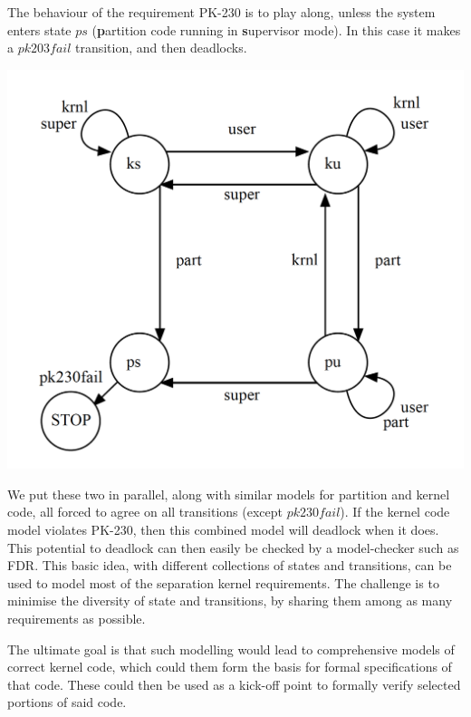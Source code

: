 The behaviour of the requirement PK-230 is to play along,
unless the system enters state $ps$
(\textbf{p}artition code running in \textbf{s}upervisor mode).
In this case it makes a $pk203fail$ transition, and then deadlocks.

\includegraphics[scale=0.35]{images/PK230LTS}

We put these two in parallel, along with similar models for partition
and kernel code, all forced to agree on all transitions (except $pk230fail$).
If the kernel code model violates PK-230, then this combined model
will deadlock when it does.
This potential to deadlock can then easily be checked by a model-checker
such as FDR.
This basic idea, with different collections of states and transitions,
can be used to model most of the separation kernel requirements.
The challenge is to minimise the diversity of state and transitions,
by sharing them among as many requirements as possible.

The ultimate goal is that such modelling would lead to comprehensive models
of correct kernel code,
which could them form the basis for formal specifications of that code.
These could then be used as a kick-off point to formally verify selected
portions of said code.



